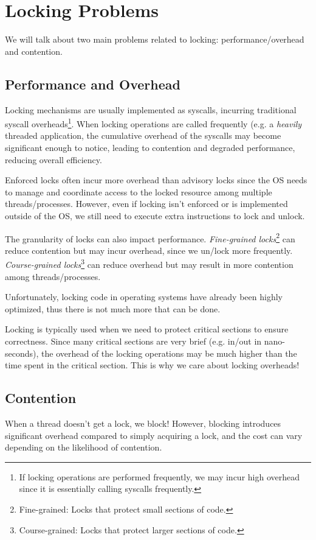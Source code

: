 \documentclass{report}
\newcommand{\asideBegin}[1]{\begin{tcolorbox}[colback=orange!5!white,colframe=black!75!orange,title={Aside:
      #1}]}
\newcommand{\asideEnd}{\end{tcolorbox}}
\begin{document}
\section{Locking Problems}
We will talk about two main problems related to locking: performance/overhead and contention.


\subsection{Performance and Overhead}
\label{subsec:PAO}
Locking mechanisms are usually implemented as syscalls, incurring traditional syscall
overheads\footnote{If locking operations are performed frequently, we may incur high overhead since
  it is essentially calling syscalls frequently.}. When locking operations are called frequently
(e.g. a \textit{heavily} threaded application, the cumulative overhead of the syscalls may become
significant enough to notice, leading to contention and degraded performance, reducing overall
efficiency.

Enforced locks often incur more overhead than advisory locks since the OS needs to manage and
coordinate access to the locked resource among multiple threads/processes. However, even if locking
isn't enforced or is implemented outside of the OS, we still need to execute extra instructions to
lock and unlock. 

The granularity of locks can also impact performance. \textit{Fine-grained
  locks}\footnote{Fine-grained: Locks that protect small sections of code.} can reduce contention but
may incur overhead, since we un/lock more frequently. \textit{Course-grained
  locks}\footnote{Course-grained: Locks that protect larger sections of code.} can reduce overhead but
may result in more contention among threads/processes. 

Unfortunately, locking code in operating systems have already been highly optimized, thus there is
not much more that can be done. 


\asideBegin{Locking Costs}
Locking is typically used when we need to protect critical sections to ensure correctness. Since
many critical sections are very brief (e.g. in/out in nano-seconds), the overhead of the locking
operations may be much higher than the time spent in the critical section. This is why we care about
locking overheads!
\asideEnd


\subsection{Contention}
When a thread doesn't get a lock, we block! However, blocking introduces significant overhead
compared to simply acquiring a lock, and the cost can vary depending on the likelihood of
contention.
\end{document}
